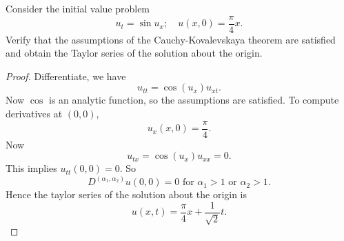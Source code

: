 
\begin{problem}
	Consider the initial value problem
\[
u_t=\sin u_x ; \quad u(x, 0)=\frac{\pi}{4} x .
\]
Verify that the assumptions of the Cauchy-Kovalevskaya theorem are satisfied and obtain the Taylor series of the solution about the origin.
\end{problem}
\begin{proof}
	Differentiate, we have
	\[
		u_{tt} = \cos (u_x) u_{x t}
	.\] 
	Now $\cos$ is an analytic function, so the assumptions are satisfied. To compute derivatives at $(0,0)$, 
	\[
		u_x(x,0) = \frac{\pi}{4}	.\] 
	Now
	\[
		u_{t x} = \cos(u_x) u_{x x} = 0
	.\] 
	This implies $u_{t t} (0,0) = 0$.
	So
\[
D^{(\alpha_1, \alpha_2)} u (0,0) = 0 \text{ for }\alpha_1 > 1 \text{ or } \alpha_2 > 1
.\] 
Hence the taylor series of the solution about the origin is
\[
	u(x,t) = \frac{\pi}{4} x + \frac{1}{\sqrt{2} } t
.\] 

\end{proof}



